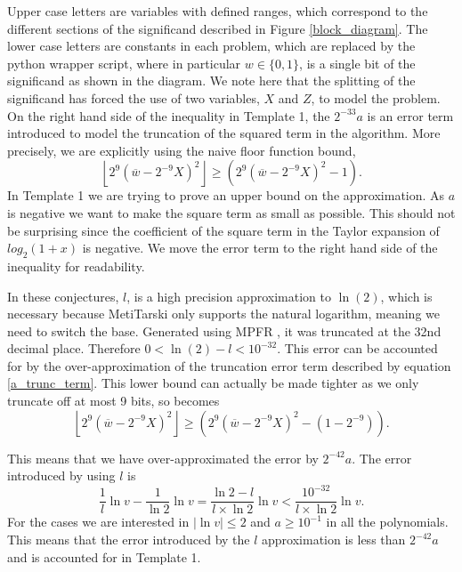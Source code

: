 \documentclass{fac}
\newcommand{\abs}[1]{\lvert#1\rvert}
\begin{document}
Upper case letters are variables with defined ranges, which correspond to the different sections of the significand described in Figure \ref{block_diagram}. The lower case letters are constants in each problem, which are replaced by the python wrapper script, where in particular $w\in \{0,1\}$, is a single bit of the significand as shown in the diagram. We note here that the splitting of the significand has forced the use of two variables, $X$ and $Z$, to model the problem. On the right hand side of the inequality in Template 1, the $2^{-33}a$ is an error term introduced to model the truncation of the squared term in the algorithm. More precisely, we are explicitly using the naive floor function bound,
\begin{equation} \label{a_trunc_term}
    \left \lfloor2^9(\overline{w}-2^{-9}X)^2\right \rfloor  
    \geq 
    (2^9(\overline{w}-2^{-9}X)^2-1).
\end{equation}
In Template 1 we are trying to prove an upper bound on the approximation. As $a$ is negative we want to make the square term as small as possible. This should not be surprising since the coefficient of the square term in the Taylor expansion of $log_2(1+x)$ is negative. We move the error term to the right hand side of the inequality for readability. 

In these conjectures, $l$, is a high precision approximation to $\ln(2)$, which is necessary because MetiTarski only supports the natural logarithm, meaning we need to switch the base. Generated using MPFR \cite{fousse2007mpfr}, it was truncated at the 32nd decimal place. Therefore $0<\ln{(2)}-l<10^{-32}$. This error can be accounted for by the over-approximation of the truncation error term described by equation \ref{a_trunc_term}. This lower bound can actually be made tighter as we only truncate off at most 9 bits, so becomes
\begin{equation*} 
    \left \lfloor2^9(\overline{w}-2^{-9}X)^2\right \rfloor  
    \geq 
    (2^9(\overline{w}-2^{-9}X)^2-(1-2^{-9})).
\end{equation*}

This means that we have over-approximated the error by $2^{-42}a$. The error introduced by using $l$ is
\begin{equation*}
    \frac{1}{l}\ln{v} - \frac{1}{\ln{2}}\ln{v} = 
    \frac{\ln{2}-l}{l\times \ln{2}}\ln{v} < \frac{10^{-32}}{l \times \ln{2}} \ln{v}. 
\end{equation*}
For the cases we are interested in $\abs{\ln{v}}\leq 2$ and $a\geq 10^{-1}$ in all the polynomials. This means that the error introduced by the $l$ approximation is less than $2^{-42}a$ and is accounted for in Template 1. 
\end{document}
